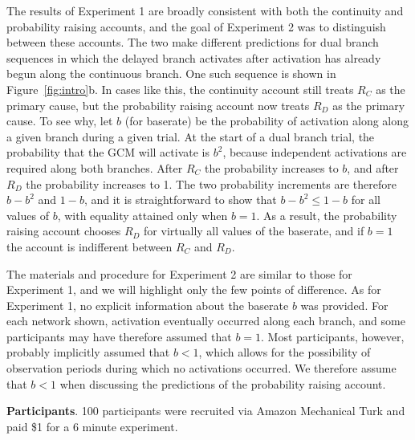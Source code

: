 \documentclass[10pt,letterpaper]{article}
\newcommand{\ev}[2]{$#1_#2$}
\begin{document}
The results of Experiment 1 are broadly consistent with both the continuity and probability raising accounts, and the goal of Experiment 2 was to distinguish between these accounts. The two make different predictions for dual branch sequences in which the delayed branch activates after activation has already begun along the continuous branch. One such sequence is shown in Figure~\ref{fig:intro}b. 
In cases like this, the continuity account still treats \ev{R}{C} as the primary cause, but the probability raising account now treats \ev{R}{D} as the primary cause. To see why, let $b$ (for baserate) be the probability of activation along along a given branch during a given trial. At the start of a dual branch trial, the probability that the GCM will activate is $b^2$, because independent activations are required along both branches. After \ev{R}{C} the probability increases to $b$, and after \ev{R}{D} the probability increases to 1. The two probability increments are therefore $b - b^2$ and $1 - b$, and it is straightforward to show that $b - b^2 \le 1 - b$ for all values of $b$, with equality attained only when $b = 1$.  As a result, the probability raising account chooses \ev{R}{D} for virtually all values of the baserate, and if $b=1$ the account is indifferent between \ev{R}{C} and \ev{R}{D}. 


The materials and procedure for Experiment 2 are similar to those for Experiment 1, and we will highlight only the few points of difference.  As for Experiment 1, no explicit information about the baserate $b$ was provided. For each network shown, activation eventually occurred along each branch, and some participants may have therefore assumed that $b=1$. Most participants, however, probably implicitly assumed that $b < 1$, which allows for the possibility of observation periods during which no activations occurred. We therefore assume that $b < 1$ when discussing the predictions of the probability raising account. 

\textbf{Participants}. 100 participants were recruited via Amazon Mechanical Turk and paid \$1 for a 6 minute experiment. 

\end{document}
